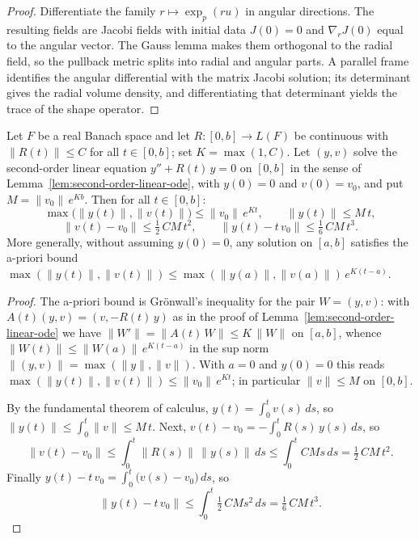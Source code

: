 \begin{proof}
\sketch
{}
Differentiate the family $r\mapsto\exp_p(ru)$ in angular directions. The resulting fields are Jacobi fields with initial data $J(0)=0$ and $\nabla_rJ(0)$ equal to the angular vector. The Gauss lemma makes them orthogonal to the radial field, so the pullback metric splits into radial and angular parts. A parallel frame identifies the angular differential with the matrix Jacobi solution; its determinant gives the radial volume density, and differentiating that determinant yields the trace of the shape operator.
\end{proof}

\begin{lemma}
\label{lem:jacobi-small-time}





Let $F$ be a real Banach space and let $R\colon[0,b]\to L(F)$ be
continuous with $\|R(t)\|\le C$ for all $t\in[0,b]$; set
$K=\max(1,C)$. Let $(y,v)$ solve the second-order linear equation
$y''+R(t)\,y=0$ on $[0,b]$ in the sense of
Lemma~\ref{lem:second-order-linear-ode}, with $y(0)=0$ and
$v(0)=v_0$, and put $M=\|v_0\|\,e^{Kb}$. Then for all $t\in[0,b]$:
$$\max\bigl(\|y(t)\|,\|v(t)\|\bigr)\le\|v_0\|\,e^{Kt},\qquad
\|y(t)\|\le M\,t,$$
$$\|v(t)-v_0\|\le\tfrac12\,CM\,t^2,\qquad
\|y(t)-t\,v_0\|\le\tfrac16\,CM\,t^3.$$
More generally, without assuming $y(0)=0$, any solution on $[a,b]$
satisfies the a-priori bound
$\max(\|y(t)\|,\|v(t)\|)\le
\max(\|y(a)\|,\|v(a)\|)\,e^{K(t-a)}$.
\end{lemma}

\begin{proof}
\sketch
{}

The a-priori bound is Gr\"onwall's inequality for the pair
$W=(y,v)$: with $A(t)(y,v)=(v,-R(t)\,y)$ as in the proof of
Lemma~\ref{lem:second-order-linear-ode} we have
$\|W'\|=\|A(t)\,W\|\le K\,\|W\|$ on $[a,b]$, whence
$\|W(t)\|\le\|W(a)\|\,e^{K(t-a)}$ in the sup norm
$\|(y,v)\|=\max(\|y\|,\|v\|)$. With $a=0$ and $y(0)=0$ this reads
$\max(\|y(t)\|,\|v(t)\|)\le\|v_0\|\,e^{Kt}$; in particular
$\|v\|\le M$ on $[0,b]$.

By the fundamental theorem of calculus,
$y(t)=\int_0^tv(s)\,ds$, so $\|y(t)\|\le\int_0^t\|v\|\le M\,t$.
Next, $v(t)-v_0=-\int_0^tR(s)\,y(s)\,ds$, so
$$\|v(t)-v_0\|\le\int_0^t\|R(s)\|\,\|y(s)\|\,ds
\le\int_0^tCMs\,ds=\tfrac12\,CM\,t^2.$$
Finally $y(t)-t\,v_0=\int_0^t\bigl(v(s)-v_0\bigr)\,ds$, so
$$\|y(t)-t\,v_0\|\le\int_0^t\tfrac12\,CMs^2\,ds
=\tfrac16\,CM\,t^3.$$
\end{proof}

